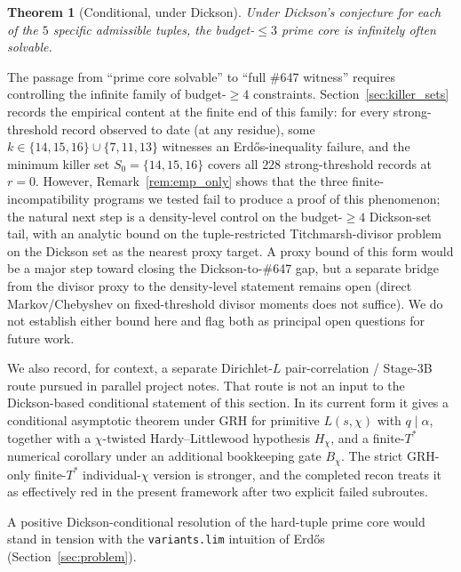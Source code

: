 \documentclass[11pt]{article}
\renewcommand{\_}{\origunderscore\allowbreak}
\newtheorem{theorem}{Theorem}[section]
\theoremstyle{definition}
\theoremstyle{remark}
\begin{document}
\begin{theorem}[Conditional, under Dickson]
Under Dickson's conjecture for each of the $5$ specific admissible
tuples, the budget-$\le 3$ prime core is infinitely often solvable.
\end{theorem}

The passage from ``prime core solvable'' to ``full \#647 witness''
requires controlling the infinite family of budget-$\ge 4$ constraints.
Section~\ref{sec:killer_sets} records the empirical content at the
finite end of this family: for every strong-threshold record observed
to date (at any residue), some $k\in\{14,15,16\}\cup\{7,11,13\}$
witnesses an Erd\H{o}s-inequality failure, and the minimum killer
set $S_0=\{14,15,16\}$ covers all $228$ strong-threshold records at
$r=0$. However, Remark~\ref{rem:emp_only} shows that the three
finite-incompatibility programs we tested fail to produce a proof of
this phenomenon; the natural next step is a density-level control on
the budget-$\ge 4$ Dickson-set tail, with an analytic bound on the
tuple-restricted Titchmarsh-divisor problem on the Dickson set as the
nearest proxy target. A proxy bound of this form would be a major
step toward closing the Dickson-to-\#647 gap, but a separate bridge
from the divisor proxy to the density-level statement remains open
(direct Markov/Chebyshev on fixed-threshold divisor moments does not
suffice). We do not establish either bound here and flag both as
principal open questions for future work.

We also record, for context, a separate Dirichlet-$L$
pair-correlation / Stage-3B route pursued in parallel project
notes. That route is not an input to the Dickson-based conditional
statement of this section. In its current form it gives a
conditional asymptotic theorem under GRH for primitive $L(s,\chi)$
with $q\mid \alpha$, together with a $\chi$-twisted
Hardy--Littlewood hypothesis $H_\chi$, and a finite-$T^*$
numerical corollary under an additional bookkeeping gate $B_\chi$.
The strict GRH-only finite-$T^*$ individual-$\chi$ version is
stronger, and the completed recon treats it as effectively red in
the present framework after two explicit failed subroutes.

A positive Dickson-conditional resolution of the hard-tuple prime
core would stand in tension with the \texttt{variants.lim}
intuition of Erd\H{o}s (Section~\ref{sec:problem}).
\end{document}
